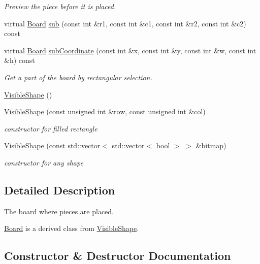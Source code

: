 \begin{DoxyCompactItemize}
\begin{DoxyCompactList}\small\item\em Preview the piece before it is placed. \end{DoxyCompactList}\item 
virtual \mbox{\hyperlink{class_board}{Board}} \mbox{\hyperlink{class_board_a158783746720e669c29fbaef379cf9ec}{sub}} (const int \&r1, const int \&c1, const int \&r2, const int \&c2) const
\item 
virtual \mbox{\hyperlink{class_board}{Board}} \mbox{\hyperlink{class_board_ae876d2d1e11732001af2cc7c667e6d0a}{sub\+Coordinate}} (const int \&x, const int \&y, const int \&w, const int \&h) const
\begin{DoxyCompactList}\small\item\em Get a part of the board by rectangular selection. \end{DoxyCompactList}\item 
\mbox{\hyperlink{class_board_a280deeca2a39d227887ff2e13b009c0a}{Visible\+Shape}} ()
\item 
\mbox{\hyperlink{class_board_adc9d11f72af8b96fdb379330fd9de592}{Visible\+Shape}} (const unsigned int \&row, const unsigned int \&col)
\begin{DoxyCompactList}\small\item\em constructor for filled rectangle \end{DoxyCompactList}\item 
\mbox{\hyperlink{class_board_a0efa89e218acbaeaf4f2453467d54cc9}{Visible\+Shape}} (const std\+::vector$<$ std\+::vector$<$ bool $>$ $>$ \&bitmap)
\begin{DoxyCompactList}\small\item\em constructor for any shape \end{DoxyCompactList}\end{DoxyCompactItemize}


\subsection{Detailed Description}
The board where pieces are placed. 

\mbox{\hyperlink{class_board}{Board}} is a derived class from \mbox{\hyperlink{class_visible_shape}{Visible\+Shape}}. 

\subsection{Constructor \& Destructor Documentation}
\mbox{\label{class_board_af73f45730119a1fd8f6670f53f959e68}} 

